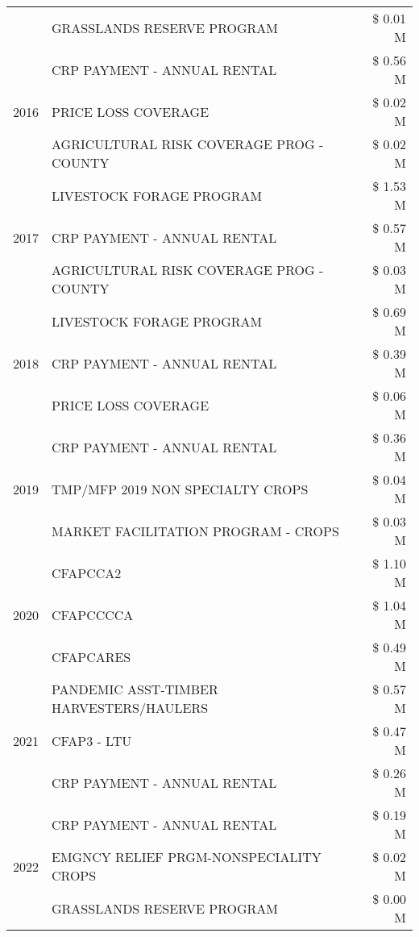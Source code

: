 \begin{tabular}{llr}
 & GRASSLANDS RESERVE PROGRAM & \$ 0.01 M \\
\cline{1-3}
\multirow[t]{3}{*}{2016} & CRP PAYMENT - ANNUAL RENTAL & \$ 0.56 M \\
 & PRICE LOSS COVERAGE & \$ 0.02 M \\
 & AGRICULTURAL RISK COVERAGE PROG - COUNTY & \$ 0.02 M \\
\cline{1-3}
\multirow[t]{3}{*}{2017} & LIVESTOCK FORAGE PROGRAM & \$ 1.53 M \\
 & CRP PAYMENT - ANNUAL RENTAL & \$ 0.57 M \\
 & AGRICULTURAL RISK COVERAGE PROG - COUNTY & \$ 0.03 M \\
\cline{1-3}
\multirow[t]{3}{*}{2018} & LIVESTOCK FORAGE PROGRAM & \$ 0.69 M \\
 & CRP PAYMENT - ANNUAL RENTAL & \$ 0.39 M \\
 & PRICE LOSS COVERAGE & \$ 0.06 M \\
\cline{1-3}
\multirow[t]{3}{*}{2019} & CRP PAYMENT - ANNUAL RENTAL & \$ 0.36 M \\
 & TMP/MFP 2019 NON SPECIALTY CROPS & \$ 0.04 M \\
 & MARKET FACILITATION PROGRAM - CROPS & \$ 0.03 M \\
\cline{1-3}
\multirow[t]{3}{*}{2020} & CFAPCCA2 & \$ 1.10 M \\
 & CFAPCCCCA & \$ 1.04 M \\
 & CFAPCARES & \$ 0.49 M \\
\cline{1-3}
\multirow[t]{3}{*}{2021} & PANDEMIC ASST-TIMBER HARVESTERS/HAULERS & \$ 0.57 M \\
 & CFAP3 - LTU & \$ 0.47 M \\
 & CRP PAYMENT - ANNUAL RENTAL & \$ 0.26 M \\
\cline{1-3}
\multirow[t]{3}{*}{2022} & CRP PAYMENT - ANNUAL RENTAL & \$ 0.19 M \\
 & EMGNCY RELIEF PRGM-NONSPECIALITY CROPS & \$ 0.02 M \\
 & GRASSLANDS RESERVE PROGRAM & \$ 0.00 M \\
\cline{1-3}
\bottomrule
\end{tabular}
